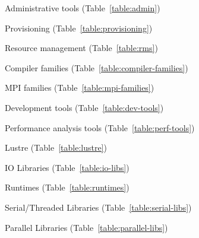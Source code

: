 \begin{itemize*}
\item Administrative tools (Table~\ref{table:admin})
\item Provisioning (Table~\ref{table:provisioning})
\fi
\item Resource management (Table~\ref{table:rms})
\item Compiler families (Table~\ref{table:compiler-families})
\item MPI families (Table~\ref{table:mpi-families})
\item Development tools (Table~\ref{table:dev-tools})
\item Performance analysis tools (Table~\ref{table:perf-tools})
\item Lustre (Table~\ref{table:lustre})
\fi

\item IO Libraries (Table~\ref{table:io-libs})
\item Runtimes (Table~\ref{table:runtimes})
\item Serial/Threaded Libraries (Table~\ref{table:serial-libs})
\item Parallel Libraries (Table~\ref{table:parallel-libs})
\end{itemize*}

